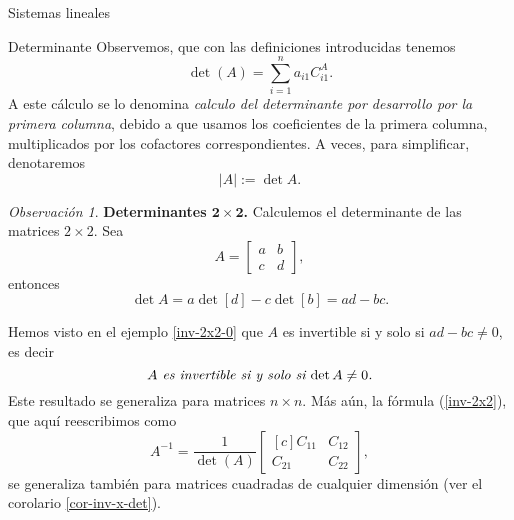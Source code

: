 \documentclass[a4paper,12pt,twoside,spanish]{amsbook}
\theoremstyle{definition}
\theoremstyle{remark}
\newtheorem{obs}{Observaci\'on}[section]
\newcommand{\C}{\mathbb C}
\begin{document}
\begin{chapter}{Sistemas lineales}
\begin{section}{Determinante}
	Observemos, que con las definiciones introducidas  tenemos
	\begin{equation}\label{def-determinante}
	\det(A) = \sum_{i=1}^{n}  a_{i1}C^A_{i1}.
	\end{equation}
	A este cálculo  se lo denomina \textit{calculo del determinante por desarrollo por la primera columna}, debido  a que usamos los coeficientes de la primera columna,  multiplicados por los cofactores correspondientes. A veces, para simplificar,  denotaremos
	$$
	|A| := \det A.
	$$
	
	\begin{obs}\textbf{Determinantes $\mathbf{2 \times 2}$.} Calculemos el determinante de las matrices $2 \times 2$. Sea 
		$$A=\begin{bmatrix}a&b\\c&d\end{bmatrix},$$  entonces
		$$
		\det A = a \det [d] - c \det [b] = ad-bc.
		$$
		
		Hemos visto en el ejemplo \ref{inv-2x2-0} que $A$ es invertible si y solo si $ ad-bc \not=0$,  es decir 
		\begin{equation}
		\text{\textit{$A$ es invertible si y solo si $ \det A \not=0$.}}
		\end{equation}
		Este resultado se generaliza para matrices $n \times n$. Más aún, la fórmula (\ref{inv-2x2}),  que aquí reescribimos como
		\begin{equation*}
			A^{-1} = \dfrac{1}{\det(A)}
			\begin{bmatrix*}[c]C_{11}&C_{12}\\C_{21}&C_{22}\end{bmatrix*},
		\end{equation*} se generaliza también para matrices cuadradas de cualquier dimensión (ver el corolario \ref{cor-inv-x-det}).
	\end{obs}
	

\end{section}
\end{chapter}
\end{document}
